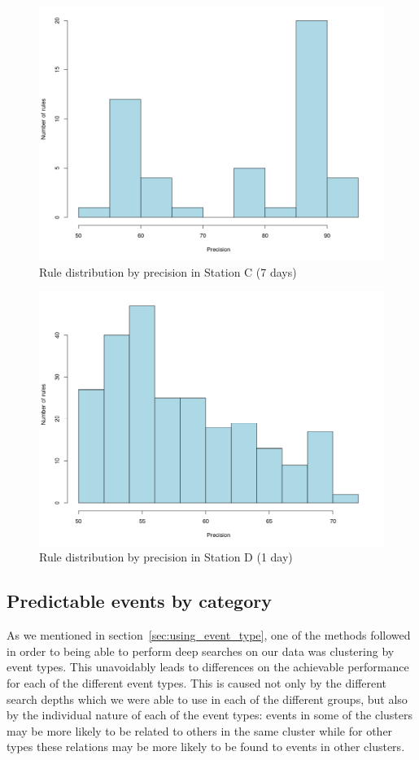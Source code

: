 \begin{figure}[hbtp]
\includegraphics[width=\textwidth]{img/hist_seg7.png}
\caption{Rule distribution by precision in Station C (7 days)} \label{fig:hist_seg7}
\end{figure}

\begin{figure}[hbtp]
\includegraphics[width=\textwidth]{img/hist_sev1.png}
\caption{Rule distribution by precision in Station D (1 day)} \label{fig:hist_sev1}
\end{figure}

\subsection{Predictable events by category}
As we mentioned in section~\ref{sec:using_event_type}, one of the methods followed in order to being able to perform deep searches on our data was clustering by event types. This unavoidably leads to differences on the achievable performance for each of the different event types. This is caused not only by the different search depths which we were able to use in each of the different groups, but also by the individual nature of each of the event types: events in some of the clusters may be more likely to be related to others in the same cluster while for other types these relations may be more likely to be found to events in other clusters. 

